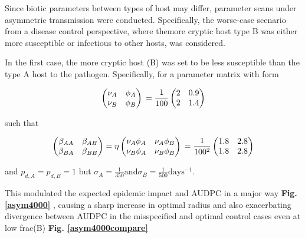 \documentclass[11pt,letterpaper]{article}
\begin{document}
{Since biotic parameters between types of host may differ, parameter scans under asymmetric transmission were conducted. Specifically, the worse-case scenario from a disease control perspective, where themore cryptic host type B was either more susceptible or infectious to other hosts, was considered. 

In the first case, the more cryptic host (B) was set to be less susceptible than the type A host to the pathogen. Specifically, for a parameter matrix with form  

\begin{equation}
	\begin{pmatrix}
		\nu_{A} & \phi_{A} \\
		\nu_{B} & \phi_{B}  \\
	\end{pmatrix} 
\newline
= \frac{1}{100}
	\begin{pmatrix}
	2 & 0.9 \\
	2 & 1.4 \\
\end{pmatrix} 
\end{equation}

such that 


\begin{equation}
	\begin{pmatrix}
		\beta_{AA} & \beta_{AB} \\
		\beta_{BA} & \beta_{BB} \\
	\end{pmatrix} = 
\eta	\begin{pmatrix}
		\nu_{A} \phi_{A}  & \nu_{A} \phi_{B}  \\
		\nu_{B} \phi_{A} & \nu_{B} \phi_{B} \\
	\end{pmatrix} \\
 = \frac{1}{100^2} \begin{pmatrix}
 1.8  & 2.8 \\
 1.8 & 2.8 \\
 \end{pmatrix} 
\end{equation}

and $p_{d,A} = p_{d,B} = 1$ but $\sigma_{A} = \frac{1}{350} \mathrm{and } \sigma_{B} = \frac{1}{500} \mathrm{days^{-1}}$. 


This modulated the expected epidemic impact and AUDPC in a major way \textbf{Fig. \ref{asym4000}} , causing a sharp increase in optimal radius and also exacerbating divergence between AUDPC in the misspecified and optimal control cases even at low frac(B) \textbf{Fig. \ref{asym4000compare}}




}
\end{document}
